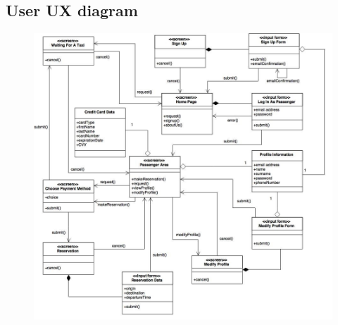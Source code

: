 \documentclass[18pt,oneside,a4paper, titlepage]{article}
\begin{document}
		\subsection{User UX diagram}
			\vspace{1.5cm}
		\begin{figure}[h]
			\centering
			\includegraphics[scale=0.46]{Diagrams/UXDiagramPassenger.jpg}
		\end{figure}
\newpage
\end{document}
